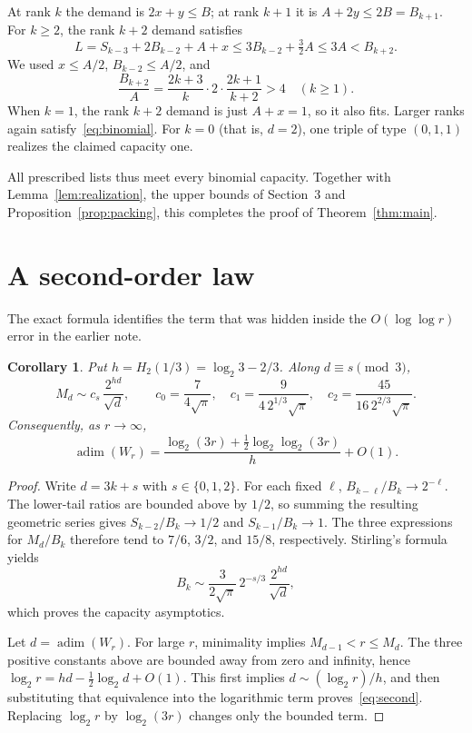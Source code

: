 \documentclass[11pt]{article}
\newtheorem{corollary}[theorem]{Corollary}
\theoremstyle{definition}
\newcommand{\adim}{\operatorname{adim}}
\numberwithin{equation}{section}
\begin{document}
At rank $k$ the demand is $2x+y\leq B$; at rank $k+1$ it is
$A+2y\leq2B=B_{k+1}$. For $k\geq2$, the rank $k+2$ demand satisfies
\[
 L=S_{k-3}+2B_{k-2}+A+x
 \leq3B_{k-2}+\tfrac32 A\leq3A < B_{k+2}.
\]
We used $x\leq A/2$, $B_{k-2}\leq A/2$, and
\[
 \frac{B_{k+2}}{A}
 =\frac{2k+3}{k}\cdot2\cdot\frac{2k+1}{k+2}>4
 \quad(k\geq1).
\]
When $k=1$, the rank $k+2$ demand is just $A+x=1$, so it also fits.
Larger ranks again satisfy~\eqref{eq:binomial}.
For $k=0$ (that is, $d=2$), one triple of type $(0,1,1)$ realizes the
claimed capacity one.

All prescribed lists thus meet every binomial capacity. Together with
Lemma~\ref{lem:realization}, the upper bounds of Section~3 and
Proposition~\ref{prop:packing}, this completes the proof of
Theorem~\ref{thm:main}.

\section{A second-order law}

The exact formula identifies the term that was hidden inside the
$O(\log\log r)$ error in the earlier note.

\begin{corollary}\label{cor:asymptotic}
Put $h=H_2(1/3)=\log_2 3-2/3$. Along $d\equiv s\pmod3$,
\[
 M_d\sim c_s\,\frac{2^{hd}}{\sqrt d},
 \qquad
 c_0=\frac7{4\sqrt\pi},\quad
 c_1=\frac9{4\,2^{1/3}\sqrt\pi},\quad
 c_2=\frac{45}{16\,2^{2/3}\sqrt\pi}.
\]
Consequently, as $r\to\infty$,
\begin{equation}\label{eq:second}
 \boxed{\adim(W_r)=
 \frac{\log_2(3r)+\tfrac12\log_2\log_2(3r)}{h}+O(1).}
\end{equation}
\end{corollary}

\begin{proof}
Write $d=3k+s$ with $s\in\{0,1,2\}$. For each fixed $\ell$,
$B_{k-\ell}/B_k\to2^{-\ell}$. The lower-tail ratios are bounded above
by $1/2$, so summing the resulting geometric series gives
$S_{k-2}/B_k\to1/2$ and $S_{k-1}/B_k\to1$.
The three expressions for $M_d/B_k$ therefore tend to
$7/6$, $3/2$, and $15/8$, respectively. Stirling's formula yields
\[
 B_k\sim \frac3{2\sqrt\pi}\,2^{-s/3}\,
              \frac{2^{hd}}{\sqrt d},
\]
which proves the capacity asymptotics.

Let $d=\adim(W_r)$. For large $r$, minimality implies
$M_{d-1}<r\leq M_d$. The three positive constants above are bounded
away from zero and infinity, hence
$\log_2 r=hd-\tfrac12\log_2 d+O(1)$.
This first implies $d\sim(\log_2 r)/h$, and then substituting that
equivalence into the logarithmic term proves~\eqref{eq:second}.
Replacing $\log_2 r$ by $\log_2(3r)$ changes only the bounded term.
\end{proof}
\end{document}
